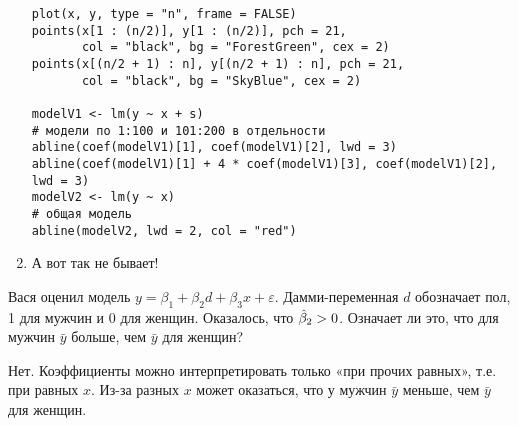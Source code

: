 \begin{problem}
\begin{sol}
\begin{enumerate}
\begin{verbatim}
plot(x, y, type = "n", frame = FALSE)
points(x[1 : (n/2)], y[1 : (n/2)], pch = 21,
       col = "black", bg = "ForestGreen", cex = 2)
points(x[(n/2 + 1) : n], y[(n/2 + 1) : n], pch = 21,
       col = "black", bg = "SkyBlue", cex = 2)

modelV1 <- lm(y ~ x + s)
# модели по 1:100 и 101:200 в отдельности
abline(coef(modelV1)[1], coef(modelV1)[2], lwd = 3)
abline(coef(modelV1)[1] + 4 * coef(modelV1)[3], coef(modelV1)[2], lwd = 3)
modelV2 <- lm(y ~ x)
# общая модель
abline(modelV2, lwd = 2, col = "red")
\end{verbatim}

\begin{minipage}{0.6\textwidth}
\begin{center}
\begin{tikzpicture}[scale = 0.025]

\end{tikzpicture}
\end{center}
\end{minipage}

\item А вот так не бывает!
\end{enumerate}
\end{sol}
\end{problem}




\begin{problem} %
Вася оценил модель $y=\beta_1+\beta_2 d+\beta_3 x+\varepsilon$. Дамми-переменная $d$ обозначает пол, 1 для мужчин и 0 для женщин. Оказалось, что $\hb_2>0$. Означает ли это, что для мужчин $\bar{y}$ больше, чем $\bar{y}$ для женщин?


\begin{sol}
Нет. Коэффициенты можно интерпретировать только «при прочих равных», т.е. при равных $x$. Из-за разных $x$ может оказаться, что у мужчин $\bar{y}$ меньше, чем $\bar{y}$ для женщин.
\end{sol}
\end{problem}





